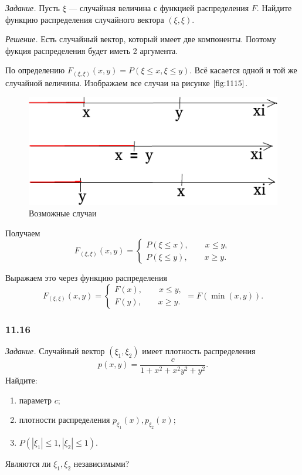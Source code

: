 \textit{Задание.} Пусть $ \xi $ --- случайная величина с функцией распределения $F$.
Найдите функцию распределения случайного вектора $ \left( \xi, \xi \right) $.

\textit{Решение.} Есть случайный вектор, который имеет две компоненты.
Поэтому фукция распределения будет иметь 2 аргумента.

По определению $F_{ \left( \xi, \xi \right) } \left( x, y \right) = P \left( \xi \leq x, \xi \leq y \right) $.
Всё касается одной и той же случайной величины.
Изображаем все случаи на рисунке $ \ref{fig:1115}$.

\begin{figure}[h!]
  \centering
  \includegraphics[width=.8\textwidth]{./pictures/11_15.png}
  \caption{Возможные случаи}
  \label{fig:1115}
\end{figure}

Получаем
$$F_{ \left( \xi, \xi \right) } \left( x, y \right) =
\begin{cases}
P \left( \xi \leq x \right), \qquad x \leq y, \\
P \left( \xi \leq y \right), \qquad x \geq y.
\end{cases}$$

Выражаем это через функцию распределения
$$F_{ \left( \xi, \xi \right) } \left( x, y \right) =
\begin{cases}
F \left( x \right), \qquad x \leq y, \\
F \left( y \right), \qquad x \geq y.
\end{cases} =
F \left( \min \left( x, y \right) \right).$$

\subsubsection*{11.16}

\textit{Задание.} Случайный вектор $ \left( \xi_1, \xi_2 \right) $ имеет плотность распределения
$$p \left( x, y \right) =
\frac{c}{1+x^2 + x^2 y^2 + y^2}.$$
Найдите:
\begin{enumerate}[label=\alph*)]
\item параметр $c$;
\item плотности распределения $p_{ \xi_1} \left( x \right), p_{ \xi_2} \left( x \right) $;
\item $P \left( \left| \xi_1 \right| \leq 1, \left| \xi_2 \right| \leq 1 \right).$
\end{enumerate}
Являются ли $ \xi_1, \xi_2$ независимыми?

